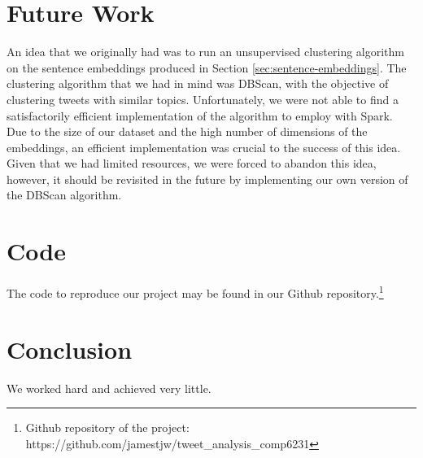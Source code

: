 \documentclass[a4paper,12pt]{article}
\begin{document}
\section{Future Work}
An idea that we originally had was to run an unsupervised clustering algorithm on the sentence embeddings produced in Section \ref{sec:sentence-embeddings}. The clustering algorithm that we had in mind was DBScan\cite{Ester96adensity-based}, with the objective of clustering tweets with similar topics. Unfortunately, we were not able to find a satisfactorily efficient implementation of the algorithm to employ with Spark. Due to the size of our dataset and the high number of dimensions of the embeddings, an efficient implementation was crucial to the success of this idea. Given that we had limited resources, we were forced to abandon this idea, however, it should be revisited in the future by implementing our own version of the DBScan algorithm.

\section{Code}
The code to reproduce our project may be found in our Github repository.\footnote{Github repository of the project: https://github.com/jamestjw/tweet\_analysis\_comp6231} 

\section{Conclusion}
We worked hard and achieved very little.

\nocite{*}



\end{document}
